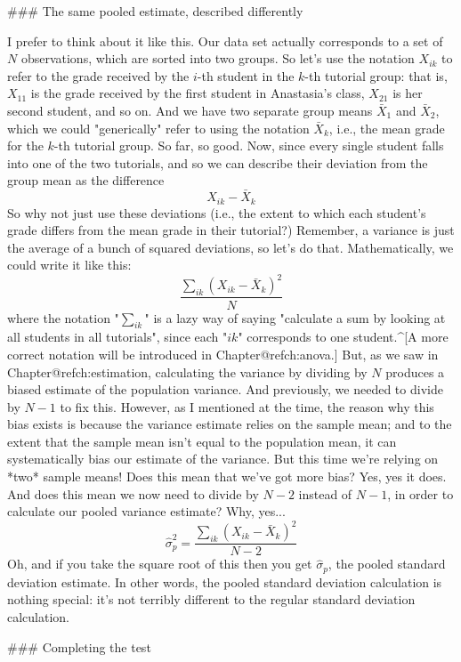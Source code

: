### The same pooled estimate, described differently

I prefer to think about it like this. Our data set actually corresponds to a set of $N$ observations, which are sorted into two groups. So let's use the notation $X_{ik}$ to refer to the grade received by the $i$-th student in the $k$-th tutorial group: that is, $X_{11}$ is the grade received by the first student in Anastasia's class, $X_{21}$ is her second student, and so on. And we have two separate group means $\bar{X}_1$ and $\bar{X}_2$, which we could "generically" refer to using the notation $\bar{X}_k$, i.e., the mean grade for the $k$-th tutorial group. So far, so good. Now, since every single student falls into one of the two tutorials, and so we can describe their deviation from the group mean as the difference
$$
X_{ik} - \bar{X}_k
$$
So why not just use these deviations (i.e., the extent to which each student's grade differs from the mean grade in their tutorial?) Remember, a variance is just the average of a bunch of squared deviations, so let's do that. Mathematically, we could write it like this:
$$
\frac{\sum_{ik} \left( X_{ik} - \bar{X}_k \right)^2}{N}
$$
where the notation "$\sum_{ik}$" is a lazy way of saying "calculate a sum by looking at all students in all tutorials", since each "$ik$" corresponds to one student.^[A more correct notation will be introduced in Chapter@refch:anova.] But, as we saw in Chapter@refch:estimation, calculating the variance by dividing by $N$ produces a biased estimate of the population variance. And previously, we needed to divide by $N-1$ to fix this. However, as I mentioned at the time, the reason why this bias exists is because the variance estimate relies on the sample mean; and to the extent that the sample mean isn't equal to the population mean, it can systematically bias our estimate of the variance. But this time we're relying on *two* sample means! Does this mean that we've got more bias? Yes, yes it does. And does this mean we now need to divide by $N-2$ instead of $N-1$, in order to calculate our pooled variance estimate? Why, yes...
$$
\hat\sigma^2_p = \frac{\sum_{ik} \left( X_{ik} - \bar{X}_k \right)^2}{N -2}
$$
Oh, and if you take the square root of this then you get $\hat{\sigma}_p$, the pooled standard deviation estimate. In other words, the pooled standard deviation calculation is nothing special: it's not terribly different to the regular standard deviation calculation. 


### Completing the test

